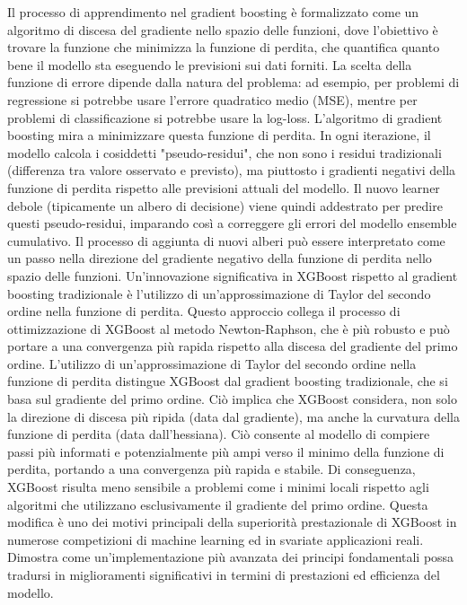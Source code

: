 \documentclass[a4paper,12pt]{report}
\begin{document}
	Il processo di apprendimento nel gradient boosting è formalizzato come un algoritmo di discesa del gradiente nello spazio delle funzioni, dove l'obiettivo è trovare la funzione che minimizza la funzione di perdita, che quantifica quanto bene il modello sta eseguendo le previsioni sui dati forniti. La scelta della funzione di errore dipende dalla natura del problema: ad esempio, per problemi di regressione si potrebbe usare l'errore quadratico medio (MSE), mentre per problemi di classificazione si potrebbe usare la log-loss. L'algoritmo di gradient boosting mira a minimizzare questa funzione di perdita.
	In ogni iterazione, il modello calcola i cosiddetti "pseudo-residui", che non sono i residui tradizionali (differenza tra valore osservato e previsto), ma piuttosto i gradienti negativi della funzione di perdita rispetto alle previsioni attuali del modello. Il nuovo learner debole (tipicamente un albero di decisione) viene quindi addestrato per predire questi pseudo-residui, imparando così a correggere gli errori del modello ensemble cumulativo.
	Il processo di aggiunta di nuovi alberi può essere interpretato come un passo nella direzione del gradiente negativo della funzione di perdita nello spazio delle funzioni. Un'innovazione significativa in XGBoost rispetto al gradient boosting tradizionale è l'utilizzo di un'approssimazione di Taylor del secondo ordine nella funzione di perdita. Questo approccio collega il processo di ottimizzazione di XGBoost al metodo Newton-Raphson, che è più robusto e può portare a una convergenza più rapida rispetto alla discesa del gradiente del primo ordine.
	L'utilizzo di un'approssimazione di Taylor del secondo ordine nella funzione di perdita distingue XGBoost dal gradient boosting tradizionale, che si basa sul gradiente del primo ordine. Ciò implica che XGBoost considera, non solo la direzione di discesa più ripida (data dal gradiente), ma anche la curvatura della funzione di perdita (data dall'hessiana). Ciò consente al modello di compiere passi più informati e potenzialmente più ampi verso il minimo della funzione di perdita, portando a una convergenza più rapida e stabile. Di conseguenza, XGBoost risulta meno sensibile a problemi come i minimi locali rispetto agli algoritmi che utilizzano esclusivamente il gradiente del primo ordine. Questa modifica è uno dei motivi principali della superiorità prestazionale di XGBoost in numerose competizioni di machine learning ed in svariate applicazioni reali. Dimostra come un'implementazione più avanzata dei principi fondamentali possa tradursi in miglioramenti significativi in termini di prestazioni ed efficienza del modello.
	
\end{document}
